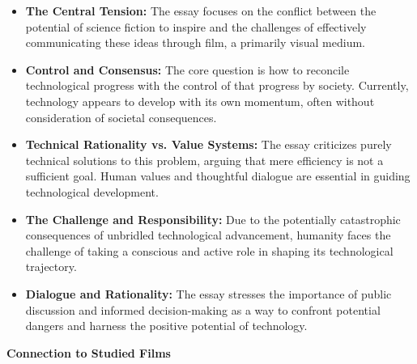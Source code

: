 \documentclass[11pt,fleqn]{book}
\begin{document}
\begin{itemize}
\item \textbf{The Central Tension:} The essay focuses on the conflict between the potential of science fiction to inspire and the challenges of effectively communicating these ideas through film, a primarily visual medium. 

\item \textbf{Control and Consensus:} The core question is how to reconcile technological progress with the control of that progress by society. Currently, technology appears to develop with its own momentum, often without consideration of societal consequences.

\item \textbf{Technical Rationality vs. Value Systems:} The essay criticizes purely technical solutions to this problem, arguing that mere efficiency is not a sufficient goal. Human values and thoughtful dialogue are essential in guiding technological development.

\item \textbf{The Challenge and Responsibility:} Due to the potentially catastrophic consequences of unbridled technological advancement, humanity faces the challenge of taking a conscious and active role in shaping its technological trajectory. 

\item \textbf{Dialogue and Rationality:} The essay stresses the importance of public discussion and informed decision-making as a way to confront potential dangers and harness the positive potential of technology.  
\end{itemize}
\vspace{5pt}
\textbf{Connection to Studied Films}
\end{document}
